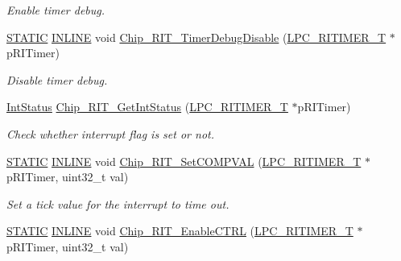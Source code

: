 \begin{DoxyCompactItemize}
\begin{DoxyCompactList}\small\item\em Enable timer debug. \end{DoxyCompactList}\item 
\hyperlink{group___l_p_c___types___public___macros_ga10b2d890d871e1489bb02b7e70d9bdfb}{S\+T\+A\+T\+IC} \hyperlink{spifi__18xx__43xx_8h_a2eb6f9e0395b47b8d5e3eeae4fe0c116}{I\+N\+L\+I\+NE} void \hyperlink{group___r_i_t_i_m_e_r__18_x_x__43_x_x_ga947baa4953f68d0de72b1df7dcd9d584}{Chip\+\_\+\+R\+I\+T\+\_\+\+Timer\+Debug\+Disable} (\hyperlink{struct_l_p_c___r_i_t_i_m_e_r___t}{L\+P\+C\+\_\+\+R\+I\+T\+I\+M\+E\+R\+\_\+T} $\ast$p\+R\+I\+Timer)
\begin{DoxyCompactList}\small\item\em Disable timer debug. \end{DoxyCompactList}\item 
\hyperlink{group___l_p_c___types___public___types_gab7d263072f745b4f3913fb0afc434c4e}{Int\+Status} \hyperlink{group___r_i_t_i_m_e_r__18_x_x__43_x_x_ga07641ae11bdca849c8f3335c32f23a23}{Chip\+\_\+\+R\+I\+T\+\_\+\+Get\+Int\+Status} (\hyperlink{struct_l_p_c___r_i_t_i_m_e_r___t}{L\+P\+C\+\_\+\+R\+I\+T\+I\+M\+E\+R\+\_\+T} $\ast$p\+R\+I\+Timer)
\begin{DoxyCompactList}\small\item\em Check whether interrupt flag is set or not. \end{DoxyCompactList}\item 
\hyperlink{group___l_p_c___types___public___macros_ga10b2d890d871e1489bb02b7e70d9bdfb}{S\+T\+A\+T\+IC} \hyperlink{spifi__18xx__43xx_8h_a2eb6f9e0395b47b8d5e3eeae4fe0c116}{I\+N\+L\+I\+NE} void \hyperlink{group___r_i_t_i_m_e_r__18_x_x__43_x_x_gab02713f81fe5c3e646149e9971fe99ca}{Chip\+\_\+\+R\+I\+T\+\_\+\+Set\+C\+O\+M\+P\+V\+AL} (\hyperlink{struct_l_p_c___r_i_t_i_m_e_r___t}{L\+P\+C\+\_\+\+R\+I\+T\+I\+M\+E\+R\+\_\+T} $\ast$p\+R\+I\+Timer, uint32\+\_\+t val)
\begin{DoxyCompactList}\small\item\em Set a tick value for the interrupt to time out. \end{DoxyCompactList}\item 
\hyperlink{group___l_p_c___types___public___macros_ga10b2d890d871e1489bb02b7e70d9bdfb}{S\+T\+A\+T\+IC} \hyperlink{spifi__18xx__43xx_8h_a2eb6f9e0395b47b8d5e3eeae4fe0c116}{I\+N\+L\+I\+NE} void \hyperlink{group___r_i_t_i_m_e_r__18_x_x__43_x_x_ga5a595690c38256c0cee81cdda9c38bda}{Chip\+\_\+\+R\+I\+T\+\_\+\+Enable\+C\+T\+RL} (\hyperlink{struct_l_p_c___r_i_t_i_m_e_r___t}{L\+P\+C\+\_\+\+R\+I\+T\+I\+M\+E\+R\+\_\+T} $\ast$p\+R\+I\+Timer, uint32\+\_\+t val)

\end{DoxyCompactItemize}
